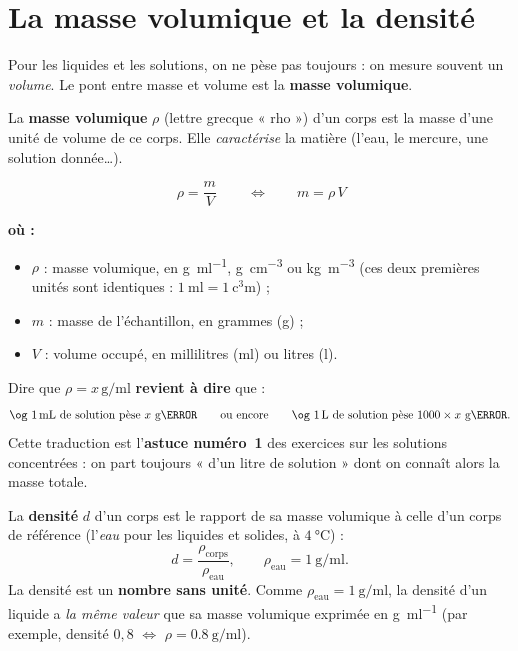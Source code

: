 \documentclass[11pt,a4paper]{article}
\newenvironment{ou}{%
  \par\smallskip\noindent\textbf{où :}\nopagebreak
  \begin{itemize}[leftmargin=1.8em,topsep=2pt,itemsep=1.5pt,parsep=0pt]}%
  {\end{itemize}}
\begin{document}
\section{La masse volumique et la densité}
Pour les liquides et les solutions, on ne pèse pas toujours : on mesure souvent un \emph{volume}.
Le pont entre masse et volume est la \textbf{masse volumique}.

\begin{definition}
La \textbf{masse volumique} $\rho$ (lettre grecque « rho ») d'un corps est la masse d'une unité de
volume de ce corps. Elle \emph{caractérise} la matière (l'eau, le mercure, une solution donnée\ldots).
\end{definition}

\begin{formule}
\[ \boxed{\,\rho = \dfrac{m}{V}\,}\qquad\Longleftrightarrow\qquad m = \rho\, V \]
\begin{ou}
  \item $\rho$ : masse volumique, en \si{\gram\per\milli\litre}, \si{\gram\per\cubic\centi\metre} ou
        \si{\kilo\gram\per\cubic\metre} (ces deux premières unités sont identiques : $\SI{1}{\milli\litre}=\SI{1}{\cubic\centi\metre}$) ;
  \item $m$ : masse de l'échantillon, en grammes (\si{\gram}) ;
  \item $V$ : volume occupé, en millilitres (\si{\milli\litre}) ou litres (\si{\litre}).
\end{ou}
\end{formule}

\begin{remarque}
Dire que $\rho = x\,\si{\gram\per\milli\litre}$ \textbf{revient à dire} que :
\[ \text{\og }\SI{1}{\milli\litre}\text{ de solution pèse } x\ \text{g\fg{}}\qquad\text{ou encore}\qquad
   \text{\og }\SI{1}{\litre}\text{ de solution pèse } 1000\times x\ \text{g\fg{}.} \]
Cette traduction est l'\textbf{astuce numéro~1} des exercices sur les solutions concentrées :
on part toujours « d'un litre de solution » dont on connaît alors la masse totale.
\end{remarque}

\begin{definition}[densité]
La \textbf{densité} $d$ d'un corps est le rapport de sa masse volumique à celle d'un corps de
référence (l'\emph{eau} pour les liquides et solides, à $\SI{4}{\celsius}$) :
\[ d = \frac{\rho_{\text{corps}}}{\rho_{\text{eau}}}, \qquad \rho_{\text{eau}} = \SI{1}{\gram\per\milli\litre}. \]
La densité est un \textbf{nombre sans unité}. Comme $\rho_{\text{eau}} = \SI{1}{\gram\per\milli\litre}$,
la densité d'un liquide a \emph{la même valeur} que sa masse volumique exprimée en \si{\gram\per\milli\litre}
(par exemple, densité $0{,}8$ $\Leftrightarrow$ $\rho = \SI{0.8}{\gram\per\milli\litre}$).
\end{definition}
\end{document}
